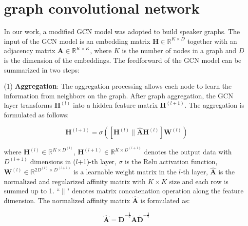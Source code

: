 \documentclass[10pt]{article}
\begin{document}
\section{graph convolutional network}
\label{sec:Review}
In our work, a modified GCN \cite{wang2019linkage} model was adopted to build speaker graphs. The input of the GCN model is an embedding matrix $\boldsymbol{H} \in \mathbb{R}^{K \times D}$ together with an adjacency matrix $\boldsymbol{A} \in \mathbb{R}^{K \times K}$, where ${K}$ is the number of nodes in a graph and ${D}$ is the dimension of the embeddings. The feedforward of the GCN model can be summarized in two steps:

(1) \textbf{Aggregation}: The aggregation processing allows each node to learn the information from neighbors on the graph. After graph aggregation, the GCN layer transforms $\boldsymbol{H}^{(l)}$ into a hidden feature matrix $\boldsymbol{H}^{(l+1)}$. The aggregation is formulated as follows:
\vspace{-0.8cm}
\begin{center}
\begin{equation}
\boldsymbol{H}^{(l+1)}=\sigma([\boldsymbol{H}^{(l)}\parallel \boldsymbol{\hat{A}}\boldsymbol{H}^{(l)}]\boldsymbol{W}^{(l)})
\end{equation}
\end{center}
\vspace{-0.2cm}
where $\boldsymbol{H}^{(l)} \in \mathbb{R}^{K \times D^{(l)}}$, $\boldsymbol{H}^{(l+1)} \in \mathbb{R}^{K \times D^{(l+1)}}$ denotes the output data with ${D^{(l+1)}}$ dimensions in ($l$+1)-th layer, $\sigma$ is the Relu activation function, $\boldsymbol{W}^{(l)} \in \mathbb{R}^{2D^{(l)} \times D^{(l+1)}}$ is a learnable weight matrix in the $l$-th layer, $\boldsymbol{\hat{A}}$ is the normalized and regularized affinity matrix with $K \times K$ size and each row is summed up to 1. ``$\parallel$" denotes matrix concatenation operation along the feature dimension. The normalized affinity matrix $\boldsymbol{\hat{A}}$ is formulated as:

\vspace{-0.8cm}
\begin{center}
\begin{equation}
\boldsymbol{\hat{A}}=\boldsymbol{\widetilde{D}}^{-\frac{1}{2}} \boldsymbol{\widetilde{A}} \boldsymbol{\widetilde{D}}^{-\frac{1}{2}}
\end{equation}
\end{center}
\vspace{-0.2cm}
\end{document}
